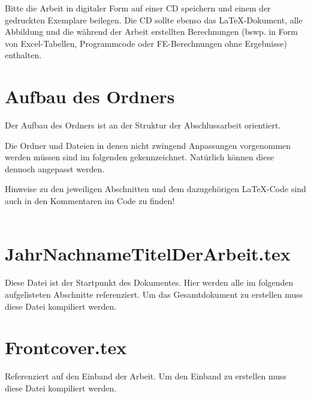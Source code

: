 Bitte die Arbeit in digitaler Form auf einer CD speichern und einem der gedruckten Exemplare beilegen. Die CD sollte ebenso das LaTeX-Dokument, alle Abbildung und die während der Arbeit erstellten Berechnungen (bswp. in Form von Excel-Tabellen, Programmcode oder FE-Berechnungen ohne Ergebnisse) enthalten.

\newpage

\section*{Aufbau des Ordners}

Der Aufbau des Ordners ist an der Struktur der Abschlussarbeit orientiert. 

Die Ordner und Dateien in denen nicht zwingend Anpassungen vorgenommen werden müssen sind im folgenden gekennzeichnet. Natürlich können diese dennoch angepasst werden.

Hinweise zu den jeweiligen Abschnitten und dem dazugehörigen LaTeX-Code sind auch in den Kommentaren im Code zu finden!\\ 
\\


\section*{JahrNachnameTitelDerArbeit.tex}

Diese Datei ist der Startpunkt des Dokumentes. Hier werden alle im folgenden aufgelisteten Abschnitte referenziert. Um das Gesamtdokument zu erstellen muss diese Datei kompiliert werden.

\section*{Frontcover.tex}

Referenziert auf den Einband der Arbeit. Um den Einband zu erstellen muss diese Datei kompiliert werden.


